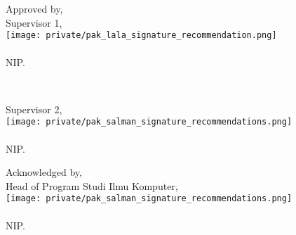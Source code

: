 \newpage
{}
\begin{center}
    \textbf{\MakeUppercase{\penulis}}\\
    \textbf{\nim}\\
\end{center}

\begin{center}
    \doublespacing
    \textbf{\MakeUppercase{\judul}}
\end{center}

\vfill
\begin{center}
    \begin{minipage}{0.50\textwidth}
        \centering
        Approved by,\\
        Supervisor 1,\\[0.7cm]
        \texttt{[image: private/pak\_lala\_signature\_recommendation.png]}\\[-0.7cm]
        \pembimbingsatu{}\\
        NIP.\ \NIPpbbsatu{}\\
    \end{minipage}
    \\[1cm]
    \begin{minipage}{0.50\textwidth}
        \centering
        Supervisor 2,\\[1cm]
        \texttt{[image: private/pak\_salman\_signature\_recommendations.png]}\\[-0.5cm]
        \pembimbingdua{}\\
        NIP.\ \NIPpbbdua{}\\
    \end{minipage}
\end{center}

\vfill
\begin{center}
    \begin{minipage}{0.50\textwidth}
        \centering
        Acknowledged by,\\
        Head of Program Studi Ilmu Komputer,\\[1cm]
        \texttt{[image: private/pak\_salman\_signature\_recommendations.png]}\\[-0.5cm]
        \pembimbingdua{}\\
        NIP.\ \NIPpbbdua{}\\
    \end{minipage}
\end{center}
\vfill
